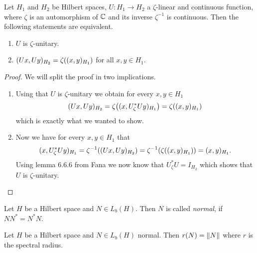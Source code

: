 \begin{proposition}
	Let $H_1$ and $H_2$ be Hilbert spaces, $U: H_1 \to H_2$ a $\zeta$-linear and continuous function, where $\zeta$ is an automorphism of $\mathbb{C}$ and its inverse $\zeta^{-1}$ is continuous. Then the following statements are equivalent.
	\begin{enumerate}[label = (\roman*)]
		\item $U$ is $\zeta$-unitary. 
		\item $(Ux , Uy)_{H_2} = \zeta{\left ( (x,y)_{H_1} \right )}$ for all $x,y \in H_1$.
	\end{enumerate}
\end{proposition}

\begin{proof}
	We will split the proof in two implications.
	\begin{enumerate}
		\item[\Quote{$(\mathrm{i}) \Rightarrow \ (\mathrm{ii})$}] Using that $U$ is $\zeta$-unitary we obtain for every $x,y \in H_1$ 
		\begin{align*}
			(Ux, Uy)_{H_2} = \zeta{\left ( (x, U_\zeta^\ast U y)_{H_1} \right )} = \zeta {\left ( (x,y)_{H_1} \right )}
		\end{align*}
		which is exactly what we wanted to show.
		
		\item[\Quote{$(\mathrm{ii}) \Rightarrow \ (\mathrm{i})$}] Now we have for every $x,y \in H_1$ that 
		\begin{align*}
			(x, U_\zeta^\ast U y)_{H_1} = \zeta^{-1}{\left ( (Ux, Uy)_{H_2} \right )} = \zeta^{-1}{\left ( \zeta{\left ( (x,y)_{H_1} \right )} \right )} = (x,y)_{H_1}.
		\end{align*}
		Using lemma 6.6.6 from Fana we now know that $U_\zeta^\ast U = I_{H_2}$ which shows that $U$ is $\zeta$-unitary.
	\end{enumerate}
\end{proof}

\begin{definition}
	Let $H$ be a Hilbert space and $N \in L_b(H)$. Then $N$ is called \textit{normal}, if $N N^\ast = N^\ast N$.
\end{definition}

\begin{proposition} \label{prop:spectral_radius}
	Let $H$ be a Hilbert space and $N \in L_b(H)$ normal. Then $r(N) = {\left \| N \right \|}_{}$ where $r$ is the spectral radius.
\end{proposition}
